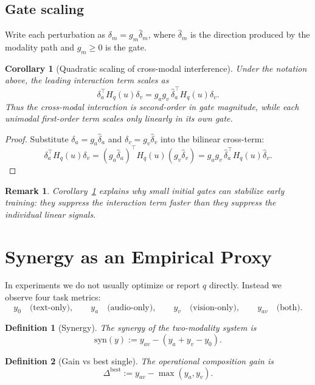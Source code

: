 \documentclass[11pt]{article}
\newtheorem{corollary}{Corollary}
\newtheorem{definition}{Definition}
\newtheorem{remark}{Remark}
\begin{document}
\subsection{Gate scaling}

Write each perturbation as $\delta_m = g_m \hat \delta_m$, where $\hat \delta_m$
is the direction produced by the modality path and $g_m \ge 0$ is the gate.

\begin{corollary}[Quadratic scaling of cross-modal interference]
\label{cor:gate}
Under the notation above, the leading interaction term scales as
\[
\delta_a^\top H_q(u)\delta_v
=
g_a g_v \, \hat \delta_a^\top H_q(u)\hat \delta_v.
\]
Thus the cross-modal interaction is second-order in gate magnitude, while each
unimodal first-order term scales only linearly in its own gate.
\end{corollary}

\begin{proof}
Substitute $\delta_a = g_a \hat\delta_a$ and $\delta_v = g_v \hat\delta_v$
into the bilinear cross-term:
\[
\delta_a^\top H_q(u)\delta_v
=
(g_a \hat\delta_a)^\top H_q(u) (g_v \hat\delta_v)
=
g_a g_v \, \hat\delta_a^\top H_q(u)\hat\delta_v.
\]
\end{proof}

\begin{remark}
Corollary~\ref{cor:gate} explains why small initial gates can stabilize early
training: they suppress the interaction term faster than they suppress the
individual linear signals.
\end{remark}

\section{Synergy as an Empirical Proxy}

In experiments we do not usually optimize or report $q$ directly. Instead we
observe four task metrics:
\[
y_0 \quad \text{(text-only)}, \qquad
y_a \quad \text{(audio-only)}, \qquad
y_v \quad \text{(vision-only)}, \qquad
y_{av} \quad \text{(both)}.
\]

\begin{definition}[Synergy]
The synergy of the two-modality system is
\begin{equation}
\mathrm{syn}(y)
:=
y_{av} - (y_a + y_v - y_0).
\label{eq:synergy}
\end{equation}
\end{definition}

\begin{definition}[Gain vs best single]
The operational composition gain is
\begin{equation}
\Delta^{\mathrm{best}}
:=
y_{av} - \max(y_a, y_v).
\label{eq:gainbest}
\end{equation}
\end{definition}
\end{document}
